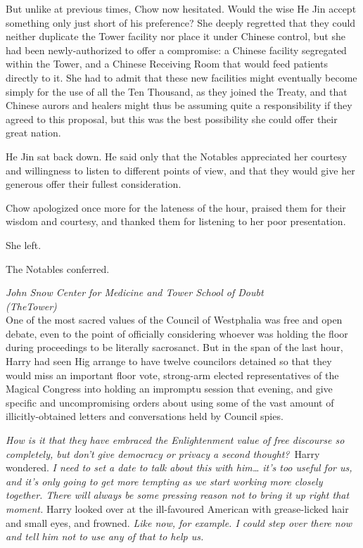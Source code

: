 But unlike at previous times, Chow now hesitated. Would the wise He Jin
accept something only just short of his preference? She deeply regretted
that they could neither duplicate the Tower facility nor place it under
Chinese control, but she had been newly-authorized to offer a
compromise: a Chinese facility segregated within the Tower, and a
Chinese Receiving Room that would feed patients directly to it. She had
to admit that these new facilities might eventually become simply for
the use of all the Ten Thousand, as they joined the Treaty, and that
Chinese aurors and healers might thus be assuming quite a responsibility
if they agreed to this proposal, but this was the best possibility she
could offer their great nation.

He Jin sat back down. He said only that the Notables appreciated her
courtesy and willingness to listen to different points of view, and that
they would give her generous offer their fullest consideration.

Chow apologized once more for the lateness of the hour, praised them for
their wisdom and courtesy, and thanked them for listening to her poor
presentation.

She left.

The Notables conferred.

\mybreak

\emph{John Snow Center for Medicine and Tower School of Doubt\\
(TheTower)}\\

One of the most sacred values of the Council of Westphalia was free and
open debate, even to the point of officially considering whoever was
holding the floor during proceedings to be literally sacrosanct. But in
the span of the last hour, Harry had seen Hig arrange to have twelve
councilors detained so that they would miss an important floor vote,
strong-arm elected representatives of the Magical Congress into holding
an impromptu session that evening, and give specific and uncompromising
orders about using some of the vast amount of illicitly-obtained letters
and conversations held by Council spies.

\emph{How is it that they have embraced the Enlightenment value of free
discourse so completely, but don't give democracy or privacy a second
thought?}~Harry wondered. \emph{I need to set a date to talk about this
with him\ldots{} it's too useful for us, and it's only going to get more
tempting as we start working more closely together. There will always be
some pressing reason not to bring it up right that moment.} Harry looked
over at the ill-favoured American with grease-licked hair and small
eyes, and frowned. \emph{Like now, for example. I could step over there
now and tell him not to use any of that to help us.}

